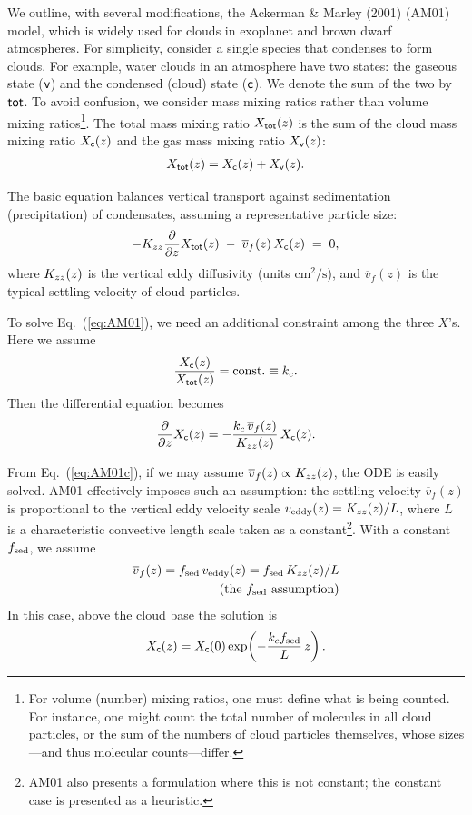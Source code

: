We outline, with several modifications, the Ackerman \& Marley (2001) \cite{ackerman2001precipitating} (AM01) model, which is widely used for clouds in exoplanet and brown dwarf atmospheres.  
For simplicity, consider a single species that condenses to form clouds.  
For example, water clouds in an atmosphere have two states: the gaseous state (${\mathsf{v}}$) and the condensed (cloud) state (${\mathsf{c}}$).  
We denote the sum of the two by ${\mathsf{tot}}$.  
To avoid confusion, we consider mass mixing ratios rather than volume mixing ratios\footnote{For volume (number) mixing ratios, one must define what is being counted. For instance, one might count the total number of molecules in all cloud particles, or the sum of the numbers of cloud particles themselves, whose sizes—and thus molecular counts—differ.}.  
The total mass mixing ratio $X_{\mathsf{tot}} (z)$ is the sum of the cloud mass mixing ratio $X_{\mathsf{c}}(z)$ and the gas mass mixing ratio $X_{\mathsf{v}} (z)$:
\begin{align}
X_{\mathsf{tot}} (z) = X_{\mathsf{c}} (z) + X_{\mathsf{v}} (z).
\end{align}

The basic equation balances vertical transport against sedimentation (precipitation) of condensates, assuming a representative particle size:
\begin{align}
\label{eq:AM01}
- K_{zz} \frac{\partial}{\partial z} X_{\mathsf{tot}} (z) \;-\; \overline{v}_f (z)\, X_{\mathsf{c}} (z) \;=\; 0,
\end{align}
where $K_{zz}(z)$ is the vertical eddy diffusivity (units $\mathrm{cm^2/s}$), and $\overline{v}_f(z)$ is the typical settling velocity of cloud particles.

To solve Eq.~(\ref{eq:AM01}), we need an additional constraint among the three $X$’s.  
Here we assume
\begin{align}
\frac{X_{\mathsf{c}} (z)}{X_{\mathsf{tot}} (z)} = \mathrm{const.} \equiv k_c.
\end{align}
Then the differential equation becomes
\begin{align}
\label{eq:AM01c}
\frac{\partial}{\partial z} X_{\mathsf{c}} (z) = - \frac{ k_c \,\overline{v}_f (z)}{K_{zz}(z)} \, X_{\mathsf{c}} (z).
\end{align}

From Eq.~(\ref{eq:AM01c}), if we may assume $\overline{v}_f (z) \propto K_{zz}(z)$, the ODE is easily solved.  
AM01 effectively imposes such an assumption: the settling velocity $\overline{v}_f(z)$ is proportional to the vertical eddy velocity scale $v_\mathrm{eddy}(z)=K_{zz}(z)/L$, where $L$ is a characteristic convective length scale taken as a constant\footnote{AM01 also presents a formulation where this is not constant; the constant case is presented as a heuristic.}.  
With a constant $f_\mathrm{sed}$, we assume
\begin{align}
\overline{v}_f(z) = f_\mathrm{sed}\, v_\mathrm{eddy}(z) = f_\mathrm{sed}\, K_{zz}(z)/L \\
\qquad\text{(the $f_\mathrm{sed}$ assumption)} \nonumber
\end{align}
In this case, above the cloud base the solution is
\begin{align}
\label{eq:AM01cx}
X_{\mathsf{c}} (z) = X_{\mathsf{c}}(0) \exp\!\left( - \frac{ k_c f_\mathrm{sed}}{L} \, z \right).
\end{align}

